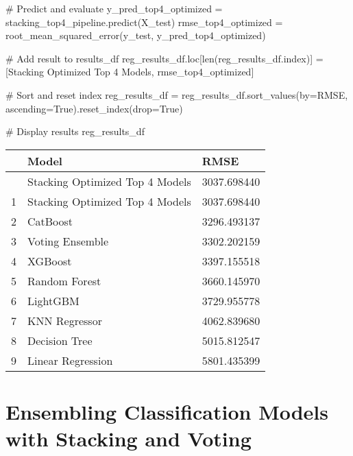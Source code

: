 \documentclass[
  letterpaper,
  DIV=11,
  numbers=noendperiod]{scrreprt}
\newenvironment{Shaded}{\begin{snugshade}}{\end{snugshade}}
\newcommand{\BuiltInTok}[1]{\textcolor[rgb]{0.00,0.23,0.31}{#1}}
\newcommand{\CommentTok}[1]{\textcolor[rgb]{0.37,0.37,0.37}{#1}}
\newcommand{\NormalTok}[1]{\textcolor[rgb]{0.00,0.23,0.31}{#1}}
\newcommand{\OperatorTok}[1]{\textcolor[rgb]{0.37,0.37,0.37}{#1}}
\newcommand{\StringTok}[1]{\textcolor[rgb]{0.13,0.47,0.30}{#1}}
\newcommand{\VariableTok}[1]{\textcolor[rgb]{0.07,0.07,0.07}{#1}}
\begin{document}
\begin{Shaded}
\begin{Highlighting}[]
\CommentTok{\# Predict and evaluate}
\NormalTok{y\_pred\_top4\_optimized }\OperatorTok{=}\NormalTok{ stacking\_top4\_pipeline.predict(X\_test)}
\NormalTok{rmse\_top4\_optimized }\OperatorTok{=}\NormalTok{ root\_mean\_squared\_error(y\_test, y\_pred\_top4\_optimized)}

\CommentTok{\# Add result to results\_df}
\NormalTok{reg\_results\_df.loc[}\BuiltInTok{len}\NormalTok{(reg\_results\_df.index)] }\OperatorTok{=}\NormalTok{ [}\StringTok{\textquotesingle{}Stacking Optimized Top 4 Models\textquotesingle{}}\NormalTok{, rmse\_top4\_optimized]}

\CommentTok{\# Sort and reset index}
\NormalTok{reg\_results\_df }\OperatorTok{=}\NormalTok{ reg\_results\_df.sort\_values(by}\OperatorTok{=}\StringTok{\textquotesingle{}RMSE\textquotesingle{}}\NormalTok{, ascending}\OperatorTok{=}\VariableTok{True}\NormalTok{).reset\_index(drop}\OperatorTok{=}\VariableTok{True}\NormalTok{)}

\CommentTok{\# Display results}
\NormalTok{reg\_results\_df}
\end{Highlighting}
\end{Shaded}

\begin{longtable}[]{@{}lll@{}}
\toprule\noalign{}
& Model & RMSE \\
\midrule\noalign{}
\endhead
\bottomrule\noalign{}
\endlastfoot
0 & Stacking Optimized Top 4 Models & 3037.698440 \\
1 & Stacking Optimized Top 4 Models & 3037.698440 \\
2 & CatBoost & 3296.493137 \\
3 & Voting Ensemble & 3302.202159 \\
4 & XGBoost & 3397.155518 \\
5 & Random Forest & 3660.145970 \\
6 & LightGBM & 3729.955778 \\
7 & KNN Regressor & 4062.839680 \\
8 & Decision Tree & 5015.812547 \\
9 & Linear Regression & 5801.435399 \\
\end{longtable}

\section{Ensembling Classification Models with Stacking and
Voting}\label{ensembling-classification-models-with-stacking-and-voting}
\end{document}
